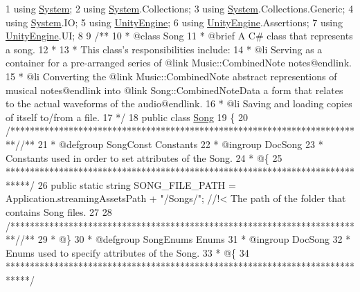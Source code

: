 \begin{DoxyCodeInclude}
1 \textcolor{keyword}{using} \hyperlink{namespace_system}{System};
2 \textcolor{keyword}{using} \hyperlink{namespace_system}{System}.Collections;
3 \textcolor{keyword}{using} \hyperlink{namespace_system}{System}.Collections.Generic;
4 \textcolor{keyword}{using} \hyperlink{namespace_system}{System}.IO;
5 \textcolor{keyword}{using} \hyperlink{namespace_unity_engine}{UnityEngine};
6 \textcolor{keyword}{using} \hyperlink{namespace_unity_engine}{UnityEngine}.Assertions;
7 \textcolor{keyword}{using} \hyperlink{namespace_unity_engine}{UnityEngine}.UI;
8 \textcolor{comment}{}
9 \textcolor{comment}{/**}
10 \textcolor{comment}{ * @class Song}
11 \textcolor{comment}{ * @brief A C# class that represents a song.}
12 \textcolor{comment}{ * }
13 \textcolor{comment}{ * This class's responsibilities include:}
14 \textcolor{comment}{ * @li Serving as a container for a pre-arranged series of @link Music::CombinedNote notes@endlink.}
15 \textcolor{comment}{ * @li Converting the @link Music::CombinedNote abstract representions of musical notes@endlink into @link
       Song::CombinedNoteData a form that relates to the actual waveforms of the audio@endlink.}
16 \textcolor{comment}{ * @li Saving and loading copies of itself to/from a file.}
17 \textcolor{comment}{*/}
18 \textcolor{keyword}{public} \textcolor{keyword}{class }\hyperlink{class_song}{Song}
19 \{
20     \textcolor{comment}{/*************************************************************************/}\textcolor{comment}{/** }
21 \textcolor{comment}{     * @defgroup SongConst Constants}
22 \textcolor{comment}{     * @ingroup DocSong}
23 \textcolor{comment}{     * Constants used in order to set attributes of the Song.}
24 \textcolor{comment}{     * @\{}
25 \textcolor{comment}{    *****************************************************************************/}
26     \textcolor{keyword}{public} \textcolor{keyword}{static} \textcolor{keywordtype}{string} SONG\_FILE\_PATH = Application.streamingAssetsPath + \textcolor{stringliteral}{"/Songs/"}; \textcolor{comment}{//!< The path of the
       folder that contains Song files.}
27 \textcolor{comment}{}
28     \textcolor{comment}{/*************************************************************************/}\textcolor{comment}{/** }
29 \textcolor{comment}{     * @\}}
30 \textcolor{comment}{     * @defgroup SongEnums Enums}
31 \textcolor{comment}{     * @ingroup DocSong}
32 \textcolor{comment}{     * Enums used to specify attributes of the Song.}
33 \textcolor{comment}{     * @\{}
34 \textcolor{comment}{    *****************************************************************************/}

\end{DoxyCodeInclude}
